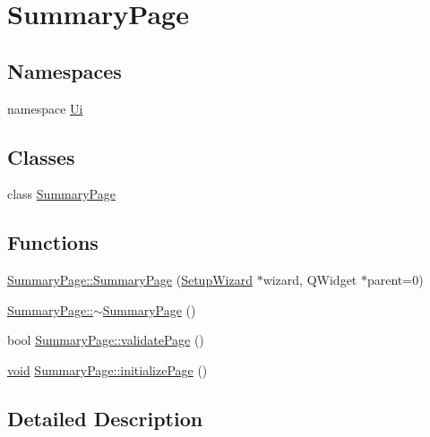 \hypertarget{group___summary_page}{\section{Summary\-Page}
\label{group___summary_page}
}
\subsection*{Namespaces}
\begin{DoxyCompactItemize}
\item 
namespace \hyperlink{namespace_ui}{Ui}
\end{DoxyCompactItemize}
\subsection*{Classes}
\begin{DoxyCompactItemize}
\item 
class \hyperlink{class_summary_page}{Summary\-Page}
\end{DoxyCompactItemize}
\subsection*{Functions}
\begin{DoxyCompactItemize}
\item 
\hyperlink{group___summary_page_gac0ed5703bf2053761d8269cc674138ed}{Summary\-Page\-::\-Summary\-Page} (\hyperlink{class_setup_wizard}{Setup\-Wizard} $\ast$wizard, Q\-Widget $\ast$parent=0)
\item 
\hyperlink{group___summary_page_ga8c25c96270b9721692e6931ea63f42a2}{Summary\-Page\-::$\sim$\-Summary\-Page} ()
\item 
bool \hyperlink{group___summary_page_ga4ae44b0f8e7ea5786172b19103d9a1af}{Summary\-Page\-::validate\-Page} ()
\item 
\hyperlink{group___u_a_v_objects_plugin_ga444cf2ff3f0ecbe028adce838d373f5c}{void} \hyperlink{group___summary_page_ga78bc91ccb12e3cce67b078982da92ac0}{Summary\-Page\-::initialize\-Page} ()
\end{DoxyCompactItemize}


\subsection{Detailed Description}


